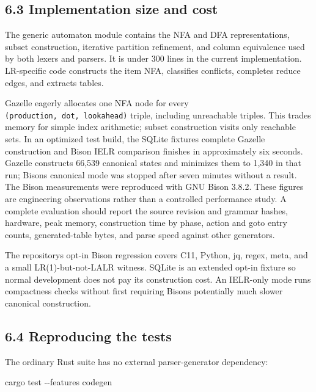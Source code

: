 \documentclass[
  10pt,
]{article}
\newenvironment{Shaded}{}{}
\newcommand{\AttributeTok}[1]{\textcolor[rgb]{0.49,0.56,0.16}{#1}}
\newcommand{\ExtensionTok}[1]{#1}
\newcommand{\NormalTok}[1]{#1}
\begin{document}
\hypertarget{63-implementation-size-and-cost}{%
\subsection{6.3 Implementation size and
cost}\label{63-implementation-size-and-cost}}

The generic automaton module contains the NFA and DFA representations,
subset construction, iterative partition refinement, and column
equivalence used by both lexers and parsers. It is under 300 lines in
the current implementation. LR-specific code constructs the item NFA,
classifies conflicts, completes reduce edges, and extracts tables.

Gazelle eagerly allocates one NFA node for every
\texttt{(production,\ dot,\ lookahead)} triple, including unreachable
triples. This trades memory for simple index arithmetic; subset
construction visits only reachable sets. In an optimized test build, the
SQLite fixture\textquotesingle s complete Gazelle construction and Bison
IELR comparison finishes in approximately six seconds. Gazelle
constructs 66,539 canonical states and minimizes them to 1,340 in that
run; Bison\textquotesingle s canonical mode was stopped after seven
minutes without a result. The Bison measurements were reproduced with
GNU Bison 3.8.2. These figures are engineering observations rather than
a controlled performance study. A complete evaluation should report the
source revision and grammar hashes, hardware, peak memory, construction
time by phase, action and goto entry counts, generated-table bytes, and
parse speed against other generators.

The repository\textquotesingle s opt-in Bison regression covers C11,
Python, jq, regex, meta, and a small LR(1)-but-not-LALR witness. SQLite
is an extended opt-in fixture so normal development does not pay its
construction cost. An IELR-only mode runs compactness checks without
first requiring Bison\textquotesingle s potentially much slower
canonical construction.

\hypertarget{64-reproducing-the-tests}{%
\subsection{6.4 Reproducing the tests}\label{64-reproducing-the-tests}}

The ordinary Rust suite has no external parser-generator dependency:

\begin{Shaded}
\begin{Highlighting}[]
\ExtensionTok{cargo}\NormalTok{ test }\AttributeTok{{-}{-}features}\NormalTok{ codegen}
\end{Highlighting}
\end{Shaded}
\end{document}
